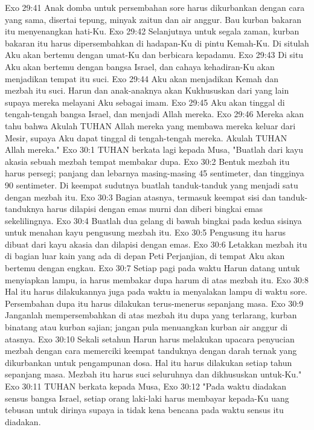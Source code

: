 Exo 29:41  Anak domba untuk persembahan sore harus dikurbankan dengan cara yang sama, disertai tepung, minyak zaitun dan air anggur. Bau kurban bakaran itu menyenangkan hati-Ku.
Exo 29:42  Selanjutnya untuk segala zaman, kurban bakaran itu harus dipersembahkan di hadapan-Ku di pintu Kemah-Ku. Di situlah Aku akan bertemu dengan umat-Ku dan berbicara kepadamu.
Exo 29:43  Di situ Aku akan bertemu dengan bangsa Israel, dan cahaya kehadiran-Ku akan menjadikan tempat itu suci.
Exo 29:44  Aku akan menjadikan Kemah dan mezbah itu suci. Harun dan anak-anaknya akan Kukhususkan dari yang lain supaya mereka melayani Aku sebagai imam.
Exo 29:45  Aku akan tinggal di tengah-tengah bangsa Israel, dan menjadi Allah mereka.
Exo 29:46  Mereka akan tahu bahwa Akulah TUHAN Allah mereka yang membawa mereka keluar dari Mesir, supaya Aku dapat tinggal di tengah-tengah mereka. Akulah TUHAN Allah mereka."
Exo 30:1  TUHAN berkata lagi kepada Musa, "Buatlah dari kayu akasia sebuah mezbah tempat membakar dupa.
Exo 30:2  Bentuk mezbah itu harus persegi; panjang dan lebarnya masing-masing 45 sentimeter, dan tingginya 90 sentimeter. Di keempat sudutnya buatlah tanduk-tanduk yang menjadi satu dengan mezbah itu.
Exo 30:3  Bagian atasnya, termasuk keempat sisi dan tanduk-tanduknya harus dilapisi dengan emas murni dan diberi bingkai emas sekelilingnya.
Exo 30:4  Buatlah dua gelang di bawah bingkai pada kedua sisinya untuk menahan kayu pengusung mezbah itu.
Exo 30:5  Pengusung itu harus dibuat dari kayu akasia dan dilapisi dengan emas.
Exo 30:6  Letakkan mezbah itu di bagian luar kain yang ada di depan Peti Perjanjian, di tempat Aku akan bertemu dengan engkau.
Exo 30:7  Setiap pagi pada waktu Harun datang untuk menyiapkan lampu, ia harus membakar dupa harum di atas mezbah itu.
Exo 30:8  Hal itu harus dilakukannya juga pada waktu ia menyalakan lampu di waktu sore. Persembahan dupa itu harus dilakukan terus-menerus sepanjang masa.
Exo 30:9  Janganlah mempersembahkan di atas mezbah itu dupa yang terlarang, kurban binatang atau kurban sajian; jangan pula menuangkan kurban air anggur di atasnya.
Exo 30:10  Sekali setahun Harun harus melakukan upacara penyucian mezbah dengan cara memerciki keempat tanduknya dengan darah ternak yang dikurbankan untuk pengampunan dosa. Hal itu harus dilakukan setiap tahun sepanjang masa. Mezbah itu harus suci seluruhnya dan dikhususkan untuk-Ku."
Exo 30:11  TUHAN berkata kepada Musa,
Exo 30:12  "Pada waktu diadakan sensus bangsa Israel, setiap orang laki-laki harus membayar kepada-Ku uang tebusan untuk dirinya supaya ia tidak kena bencana pada waktu sensus itu diadakan.

